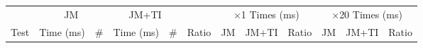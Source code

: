 %
%

\begin{figure*}[ht]
\centering
\begin{tabular}{lr@{.}lrr@{.}lrr@{.}lr@{.}lr@{.}lr@{.}lr@{.}lr@{.}lr@{.}l}

\toprule

           & \multicolumn{3}{c}{JM}
           & \multicolumn{3}{c}{JM+TI}
           & \multicolumn{2}{c}{}
           & \multicolumn{6}{c}{$\times$1 Times (ms)}
           & \multicolumn{6}{c}{$\times$20 Times (ms)} \\

\cmidrule(r){2-4}
\cmidrule{5-7}
\cmidrule(r){10-15}
\cmidrule{16-21}

Test       & \multicolumn{2}{c}{Time (ms)} & \#
           & \multicolumn{2}{c}{Time (ms)} & \#
           & \multicolumn{2}{c}{Ratio}
           & \multicolumn{2}{c}{JM}
           & \multicolumn{2}{c}{JM+TI}
           & \multicolumn{2}{c}{Ratio}
           & \multicolumn{2}{c}{JM}
           & \multicolumn{2}{c}{JM+TI}
           & \multicolumn{2}{c}{Ratio} \\

\midrule


\end{tabular}
\end{figure*}
